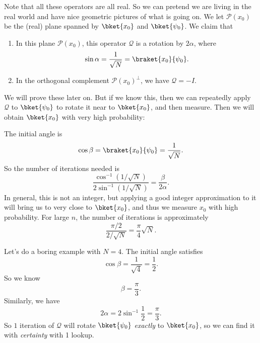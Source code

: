 \documentclass[a4paper]{article}
\begin{document}
Note that all these operators are all real. So we can pretend we are living in the real world and have nice geometric pictures of what is going on. We let $\mathcal{P}(x_0)$ be the (real) plane spanned by $\bket{x_0}$ and $\bket{\psi_0}$. We claim that
\begin{enumerate}
  \item In this plane $\mathcal{P}(x_0)$, this operator $\mathcal{Q}$ is a rotation by $2\alpha$, where
    \[
      \sin\alpha = \frac{1}{\sqrt{N}} = \braket{x_0}{\psi_0}.
    \]
  \item In the orthogonal complement $\mathcal{P}(x_0)^\perp$, we have $\mathcal{Q} = -I$.
\end{enumerate}
We will prove these later on. But if we know this, then we can repeatedly apply $\mathcal{Q}$ to $\bket{\psi_0}$ to rotate it near to $\bket{x_0}$, and then measure. Then we will obtain $\bket{x_0}$ with very high probability:
\begin{center}
\end{center}
The initial angle is
\[
  \cos \beta = \braket{x_0}{\psi_0} = \frac{1}{\sqrt{N}}.
\]
So the number of iterations needed is
\[
  \frac{\cos^{-1}(1/\sqrt{N})}{2 \sin^{-1}(1/\sqrt{N})} = \frac{\beta}{2\alpha}.
\]
In general, this is not an integer, but applying a good integer approximation to it will bring us to very close to $\bket{x_0}$, and thus we measure $x_0$ with high probability. For large $n$, the number of iterations is approximately
\[
  \frac{\pi/2}{2/\sqrt{N}} = \frac{\pi}{4} \sqrt{N}.
\]
\begin{eg}
  Let's do a boring example with $N = 4$. The initial angle satisfies
  \[
    \cos \beta = \frac{1}{\sqrt{4}} = \frac{1}{2}.
  \]
  So we know
  \[
    \beta = \frac{\pi}{3}.
  \]
  Similarly, we have
  \[
    2\alpha = 2 \sin^{-1}\frac{1}{2} = \frac{\pi}{3}.
  \]
  So $1$ iteration of $\mathcal{Q}$ will rotate $\bket{\psi_0}$ \emph{exactly} to $\bket{x_0}$, so we can find it with \emph{certainty} with 1 lookup.
\end{eg}
\end{document}
